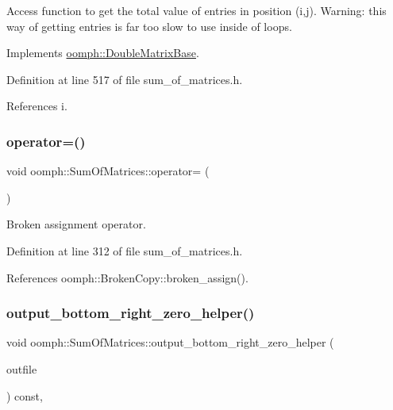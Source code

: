 Access function to get the total value of entries in position (i,j). Warning\+: this way of getting entries is far too slow to use inside of loops. 

Implements \hyperlink{classoomph_1_1DoubleMatrixBase_a20b85f0286f80464f42f0846fede2d77}{oomph\+::\+Double\+Matrix\+Base}.



Definition at line 517 of file sum\+\_\+of\+\_\+matrices.\+h.



References i.

\mbox{\label{classoomph_1_1SumOfMatrices_a8ede2928f871c55a77c567ebfb60b5ea}} 
\subsubsection{\texorpdfstring{operator=()}{operator=()}}
{\footnotesize\ttfamily void oomph\+::\+Sum\+Of\+Matrices\+::operator= (\begin{DoxyParamCaption}\item[{const \hyperlink{classoomph_1_1SumOfMatrices}{Sum\+Of\+Matrices} \&}]{ }\end{DoxyParamCaption})\hspace{0.3cm}{\ttfamily [inline]}}



Broken assignment operator. 



Definition at line 312 of file sum\+\_\+of\+\_\+matrices.\+h.



References oomph\+::\+Broken\+Copy\+::broken\+\_\+assign().

\mbox{\label{classoomph_1_1SumOfMatrices_a13408a013cf37a9455b9813b7a19fb0e}} 
\subsubsection{\texorpdfstring{output\+\_\+bottom\+\_\+right\+\_\+zero\+\_\+helper()}{output\_bottom\_right\_zero\_helper()}}
{\footnotesize\ttfamily void oomph\+::\+Sum\+Of\+Matrices\+::output\+\_\+bottom\+\_\+right\+\_\+zero\+\_\+helper (\begin{DoxyParamCaption}\item[{std\+::ostream \&}]{outfile }\end{DoxyParamCaption}) const\hspace{0.3cm}{\ttfamily [inline]}, {\ttfamily [virtual]}}



